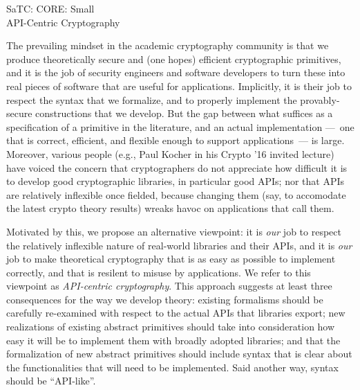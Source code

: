 \documentclass[10pt]{article}
\begin{document}
\thispagestyle{empty}

\begin{center}
{\Large SaTC: CORE: Small }\\ 
{\Large API-Centric Cryptography\\} 
\end{center}

\noindent
The prevailing mindset in the academic cryptography community is that
we produce theoretically secure and (one hopes) efficient
cryptographic primitives, and it is the job of security engineers and
software developers to turn these into real pieces of software that
are useful for applications.  Implicitly, it is their job to respect
the syntax that we formalize, and to properly implement the
provably-secure constructions that we develop.  But
the gap between what suffices as a
specification of a primitive in the literature, and an actual
implementation ---~one that is correct, efficient, and flexible enough
to support applications~--- is large.  Moreover, various 
people (e.g., Paul Kocher in his Crypto '16 invited lecture) have
voiced the concern that cryptographers do not appreciate how
difficult it is to develop good cryptographic libraries, in particular
good APIs; nor that APIs are relatively inflexible once fielded,
because changing them (say, to accomodate the latest crypto theory
results) wreaks havoc on applications that call them.

Motivated by this, we propose an alternative viewpoint: it is
\emph{our} job to respect the relatively inflexible nature of
real-world libraries and their APIs, and it is \emph{our} job to make
theoretical cryptography that is as easy as possible to implement
correctly, and that is resilent to misuse by applications. We refer to this viewpoint as
\emph{API-centric cryptography}.  This approach suggests at least
three consequences for the way we develop theory: existing formalisms
should be carefully re-examined with respect to the actual APIs that
libraries export; new realizations of existing abstract primitives
should take into consideration how easy it will be to implement them
with broadly adopted libraries; and that the formalization of new
abstract primitives should include syntax that is clear about the
functionalities that will need to be implemented. Said another way, syntax
should be ``API-like''.
\end{document}
